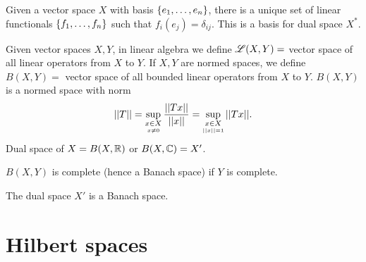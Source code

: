 \documentclass[]{article}
\begin{document}
\begin{definition}
	 Given a vector space $X$ with basis $\left\{ e_1,\dots,e_n \right\}$, there is a unique set of linear functionals $\left\{ f_1,\dots,f_n \right\}$ such that $f_i(e_j) = \delta_{ij}$. %
	This is a basis for dual space $X^*$.
\end{definition}
Given vector spaces $X,Y$, in linear algebra we define $\mathscr{L}(X,Y) = $ vector space of all linear operators from $X$ to $Y$. 
If $X,Y$ are normed spaces, we define $B(X,Y) = $ vector space of all bounded linear operators from $X$ to $Y$.
$B(X,Y)$ is a normed space with norm $$||T|| = \sup_{\underset{x\neq0}{x\in X}} \frac{||Tx||}{||x||} = \sup_{\underset{||x||=1}{x\in X}}||Tx||.$$
Dual space of $X = B(X,\mathbb{R})$ or $B(X,\mathbb{C}) = X'$.

\begin{theorem}
	$B(X,Y)$ is complete (hence a Banach space) if $Y$ is complete.
\end{theorem}
\begin{corollary}
	The dual space $X'$ is a Banach space.
\end{corollary}

\section{Hilbert spaces}
\end{document}
